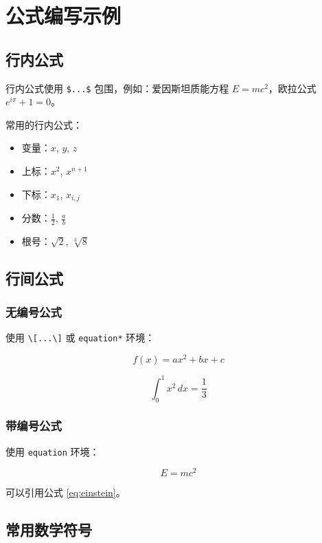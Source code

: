 
\chapter{公式编写示例}

\section{行内公式}

行内公式使用 \texttt{\$...\$} 包围，例如：爱因斯坦质能方程 $E=mc^2$，欧拉公式 $e^{i\pi}+1=0$。

常用的行内公式：
\begin{itemize}
  \item 变量：$x$, $y$, $z$
  \item 上标：$x^2$, $x^{n+1}$
  \item 下标：$x_1$, $x_{i,j}$
  \item 分数：$\frac{1}{2}$, $\frac{a}{b}$
  \item 根号：$\sqrt{2}$, $\sqrt[3]{8}$
\end{itemize}

\section{行间公式}

\subsection{无编号公式}

使用 \texttt{\textbackslash[...\textbackslash]} 或 \texttt{equation*} 环境：

\[
  f(x) = ax^2 + bx + c
\]

\begin{equation*}
  \int_0^1 x^2 \, dx = \frac{1}{3}
\end{equation*}

\subsection{带编号公式}

使用 \texttt{equation} 环境：

\begin{equation}
  E = mc^2
  \label{eq:einstein}
\end{equation}

可以引用公式 \eqref{eq:einstein}。

\section{常用数学符号}

